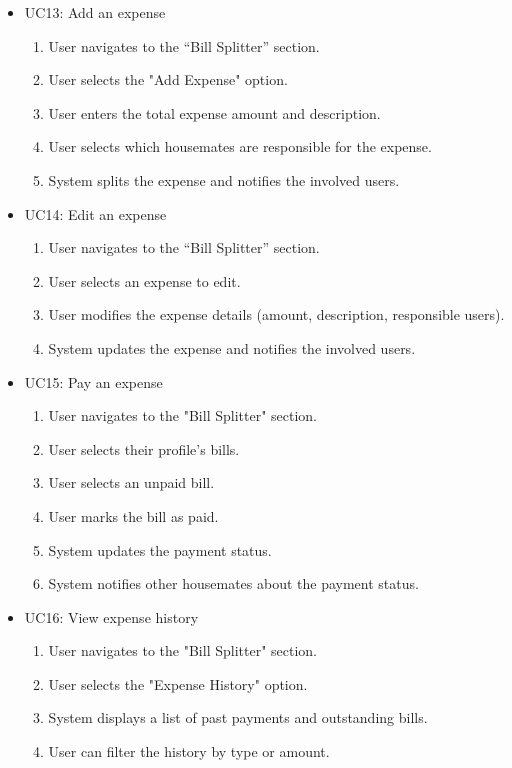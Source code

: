 \documentclass{scrreprt}
\theoremstyle{definition}
\begin{document}
\begin{itemize}
    \item UC13: Add an expense
    \begin{enumerate}
        \item User navigates to the “Bill Splitter” section.
        \item User selects the "Add Expense" option.
        \item User enters the total expense amount and description.
        \item User selects which housemates are responsible for the expense.
        \item System splits the expense and notifies the involved users.
    \end{enumerate}
    
    \item UC14: Edit an expense
    \begin{enumerate}
        \item User navigates to the “Bill Splitter” section.
        \item User selects an expense to edit.
        \item User modifies the expense details (amount, description, responsible users).
        \item System updates the expense and notifies the involved users.
    \end{enumerate}
    
    \item UC15: Pay an expense
    \begin{enumerate}
        \item User navigates to the "Bill Splitter" section.
        \item User selects their profile's bills.
        \item User selects an unpaid bill.
        \item User marks the bill as paid.
        \item System updates the payment status.
        \item System notifies other housemates about the payment status.
    \end{enumerate}
    
    \item UC16: View expense history
    \begin{enumerate}
        \item User navigates to the "Bill Splitter" section.
        \item User selects the "Expense History" option.
        \item System displays a list of past payments and outstanding bills.
        \item User can filter the history by type or amount.
    \end{enumerate}
    

\end{itemize}
\end{document}
